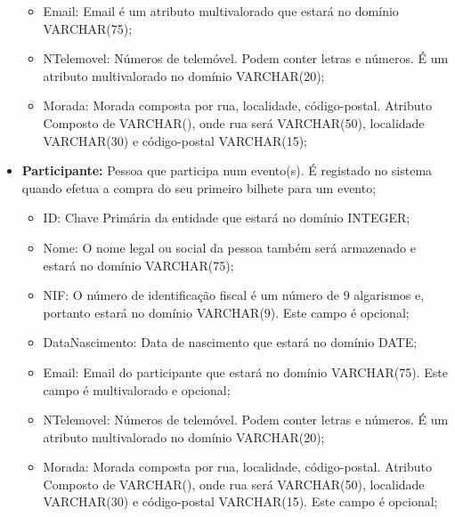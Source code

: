 \documentclass[a4paper,12pt]{scrreprt}
\begin{document}
\begin{itemize}
\begin{itemize}
                     \item{Email:} Email é um atributo multivalorado que estará no domínio VARCHAR(75);
                       
                     \item{NTelemovel:} Números de telemóvel. Podem conter letras e números. É um atributo multivalorado no domínio VARCHAR(20);
                       
                     \item{Morada:} Morada composta por rua, localidade, código-postal. Atributo Composto de VARCHAR(), onde rua será VARCHAR(50), localidade VARCHAR(30) e código-postal VARCHAR(15);
                       
                     \end{itemize}
                 \item{\textbf{Participante:}} Pessoa que participa num evento(s). É registado no sistema quando efetua a compra do seu primeiro bilhete para um evento;
                     \begin{itemize}
                     \item{ID:} Chave Primária da entidade que estará no domínio INTEGER;
                       
                     \item{Nome:} O nome legal ou social da pessoa também será armazenado e estará
                       no domínio VARCHAR(75);
                       
                     \item{NIF:} O número de identificação fiscal é um número de 9 algarismos e, portanto estará no domínio VARCHAR(9). Este campo é opcional;
                       
                     \item{DataNascimento:} Data de nascimento que estará no domínio DATE;
                       
                     \item{Email:} Email do participante que estará no domínio VARCHAR(75). Este campo é multivalorado e opcional;
                       
                     \item{NTelemovel:} Números de telemóvel. Podem conter letras e números. É um atributo multivalorado no domínio VARCHAR(20);
                       
                     \item{Morada:} Morada composta por rua, localidade, código-postal. Atributo Composto de VARCHAR(), onde rua será VARCHAR(50), localidade VARCHAR(30) e código-postal VARCHAR(15). Este campo é opcional;
                       

\end{itemize}
\end{itemize}
\end{document}
